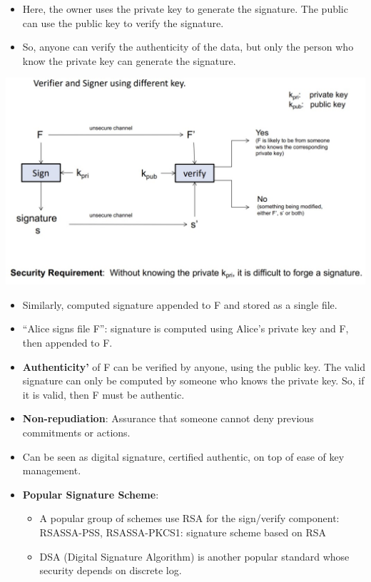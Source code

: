 \documentclass[10pt, landscape]{article}
\begin{document}
\begin{multicols*}{3}
\begin{itemize}
\item Here, the owner uses the private key to generate the signature. The public can
use the public key to verify the signature.
\item So, anyone can verify the authenticity of the data, but only the person who know
the private key can generate the signature.
\end{itemize}

\centerline{\includegraphics[width=0.9\linewidth]{Signature}}	

\begin{itemize}
\item Similarly, computed signature appended to F and stored as a single file.
\item ``Alice signs file F'': signature is computed using Alice's private key and F, then appended to F.
\item \textbf{Authenticity'} of F can be verified by anyone, using the public key. The valid signature 
can only be computed by someone who knows the private key. So, if it is valid, then F must be 
authentic. 
\item \textbf{Non-repudiation}:  Assurance that someone cannot deny previous commitments or 
actions.
\item	Can be seen as digital signature, certified authentic, on top of ease of key management.
\item \textbf{Popular Signature Scheme}:
	\begin{itemize}
	\item A popular group of schemes use RSA for the sign/verify component: RSASSA-PSS, RSASSA-PKCS1: signature scheme based on RSA
	\item DSA (Digital Signature Algorithm) is another popular standard whose security
depends on discrete log.
	\end{itemize}
\end{itemize}


\end{multicols*}
\end{document}
